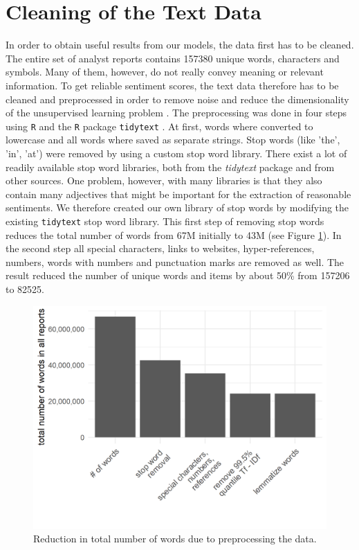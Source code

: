 \section{Cleaning of the Text Data}\label{cleaningText}
In order to obtain useful results from our models, the data first has to be cleaned. The entire set of analyst reports contains 157380 unique words, characters and symbols. Many of them, however, do not really convey meaning or relevant information. To get reliable sentiment scores, the text data therefore has to be cleaned and preprocessed in order to remove noise and reduce the dimensionality of the unsupervised learning problem \citep{HADDI201326}. The preprocessing was done in four steps using \texttt{R} \citep{Rproject} and the \texttt{R} package \texttt{tidytext} \citep{tidytext}. At first, words where converted to lowercase and all words where saved as separate strings. Stop words (like 'the', 'in', 'at') were removed by using a custom stop word library. There exist a lot of readily available stop word libraries, both from the \textit{tidytext} package and from other sources. One problem, however, with many libraries is that they also contain many adjectives that might be important for the extraction of reasonable sentiments. We therefore created our own library of stop words by modifying the existing \texttt{tidytext} stop word library. This first step of removing stop words reduces the total number of words from 67M initially to 43M (see Figure \ref{fig:TotWord}). In the second step all special characters, links to websites, hyper-references, numbers, words with numbers and punctuation marks are removed as well. The result reduced the number of unique words and items by about 50\% from 157206 to 82525.  \\ 

\begin{figure}[h]
\centering
\includegraphics[width=\textwidth]{figures/ReductionInTotalNWords.png}
\caption{Reduction in total number of words due to preprocessing the data.}
\label{fig:TotWord}
\end{figure}

